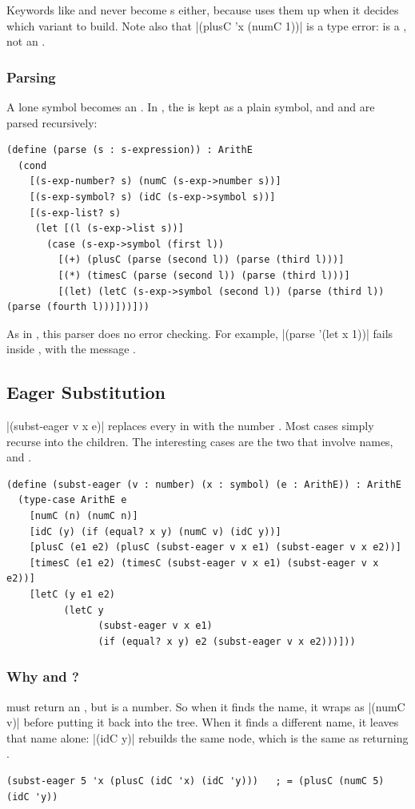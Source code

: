 Keywords like \code{+} and  never become s either, because  uses them up when it decides which variant to build. Note also that \rkt|(plusC 'x (numC 1))| is a type error:  is a , not an .

\subsubsection{Parsing} A lone symbol becomes an . In , the  is kept as a plain symbol, and  and  are parsed recursively:
\begin{lstlisting}
(define (parse (s : s-expression)) : ArithE
  (cond
    [(s-exp-number? s) (numC (s-exp->number s))]
    [(s-exp-symbol? s) (idC (s-exp->symbol s))]
    [(s-exp-list? s)
     (let [(l (s-exp->list s))]
       (case (s-exp->symbol (first l))
         [(+) (plusC (parse (second l)) (parse (third l)))]
         [(*) (timesC (parse (second l)) (parse (third l)))]
         [(let) (letC (s-exp->symbol (second l)) (parse (third l)) (parse (fourth l)))]))]))
\end{lstlisting}
As in , this parser does no error checking. For example, \rkt|(parse '(let x 1))| fails inside , with the message .

\subsection{Eager Substitution}

\rkt|(subst-eager v x e)| replaces every  in  with the number . Most cases simply recurse into the children. The interesting cases are the two that involve names,  and .
\begin{lstlisting}
(define (subst-eager (v : number) (x : symbol) (e : ArithE)) : ArithE
  (type-case ArithE e
    [numC (n) (numC n)]
    [idC (y) (if (equal? x y) (numC v) (idC y))]
    [plusC (e1 e2) (plusC (subst-eager v x e1) (subst-eager v x e2))]
    [timesC (e1 e2) (timesC (subst-eager v x e1) (subst-eager v x e2))]
    [letC (y e1 e2)
          (letC y
                (subst-eager v x e1)
                (if (equal? x y) e2 (subst-eager v x e2)))]))
\end{lstlisting}

\subsubsection{Why  and ?}  must return an , but  is a number. So when it finds the name, it wraps  as \rkt|(numC v)| before putting it back into the tree. When it finds a different name, it leaves that name alone: \rkt|(idC y)| rebuilds the same node, which is the same as returning .
\begin{lstlisting}
(subst-eager 5 'x (plusC (idC 'x) (idC 'y)))   ; = (plusC (numC 5) (idC 'y))
\end{lstlisting}

